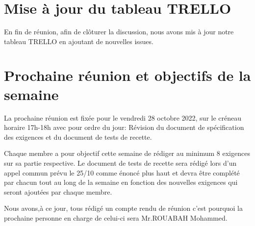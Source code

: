 \documentclass[a4paper, 12pt]{article}
\begin{document}
\section{Mise à jour du tableau TRELLO} 
En fin de réunion, afin de clôturer la discussion, nous avons mis à jour notre tableau TRELLO en ajoutant de nouvelles issues.

\section{Prochaine réunion et objectifs de la semaine}
La prochaine réunion est fixée pour le vendredi 28 octobre 2022, sur le créneau horaire 17h-18h avec pour ordre du jour: Révision du document de spécification des exigences et du document de tests de recette.


Chaque membre a pour objectif cette semaine de rédiger au minimum 8 exigences sur sa partie respective.
Le document de tests de recette sera rédigé lors d'un appel commun prévu le 25/10 comme énoncé plus haut et devra être complété par chacun tout au long de la semaine en fonction des nouvelles exigences qui seront ajoutées par chaque membre.

Nous avons,à ce jour, tous rédigé un compte rendu de réunion c'est pourquoi la prochaine personne en charge de celui-ci sera Mr.ROUABAH Mohammed.
\end{document}
